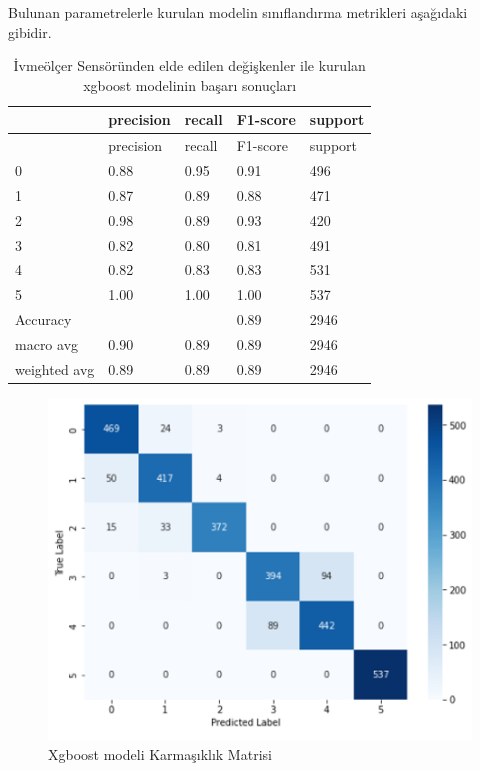 \documentclass[12pt,twoside]{deuthesis}
\begin{document}
Bulunan parametrelerle kurulan modelin sınıflandırma metrikleri aşağıdaki gibidir.
\begin{longtable}[]{@{}lllll@{}}
\caption{\label{tab:ixgboost} İvmeölçer Sensöründen elde edilen değişkenler ile kurulan xgboost modelinin başarı sonuçları}\tabularnewline
\toprule()
& precision & recall & F1-score & support \\
\midrule()
\endfirsthead
\toprule()
& precision & recall & F1-score & support \\
\midrule()
\endhead
0 & 0.88 & 0.95 & 0.91 & 496 \\
1 & 0.87 & 0.89 & 0.88 & 471 \\
2 & 0.98 & 0.89 & 0.93 & 420 \\
3 & 0.82 & 0.80 & 0.81 & 491 \\
4 & 0.82 & 0.83 & 0.83 & 531 \\
5 & 1.00 & 1.00 & 1.00 & 537 \\
Accuracy & & & 0.89 & 2946 \\
macro avg & 0.90 & 0.89 & 0.89 & 2946 \\
weighted avg & 0.89 & 0.89 & 0.89 & 2946 \\
\bottomrule()
\end{longtable}
\begin{figure}

{\centering \includegraphics[width=0.9\linewidth,height=0.35\textheight]{figure/ixgboost_confmat} 

}

\caption{Xgboost modeli Karmaşıklık Matrisi}\label{fig:ixgboostconfmat}
\end{figure}
\end{document}
